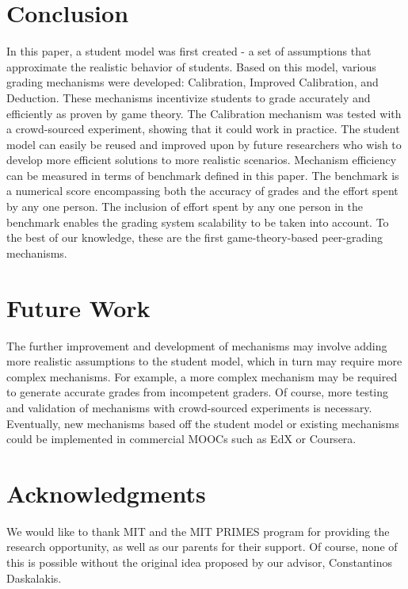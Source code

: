 \documentclass{chi-ext}
\begin{document}


\section{Conclusion}
In this paper, a student model was first created - a set of assumptions that approximate the realistic behavior of students. Based on this model, various grading mechanisms were developed: Calibration, Improved Calibration, and Deduction. These mechanisms incentivize students to grade accurately and efficiently as proven by game theory. The Calibration mechanism was tested with a crowd-sourced experiment, showing that it could work in practice. The student model can easily be reused and improved upon by future researchers who wish to develop more efficient solutions to more realistic scenarios. Mechanism efficiency can be measured in terms of benchmark defined in this paper. The benchmark is a numerical score encompassing both the accuracy of grades and the effort spent by any one person. The inclusion of effort spent by any one person in the benchmark enables the grading system scalability to be taken into account. To the best of our knowledge, these are the first game-theory-based peer-grading mechanisms.

\section{Future Work}
The further improvement and development of mechanisms may involve adding more realistic assumptions to the student model, which in turn may require more complex mechanisms. For example, a more complex mechanism may be required to generate accurate grades from incompetent graders. Of course, more testing and validation of mechanisms with crowd-sourced experiments is necessary. Eventually, new mechanisms based off the student model or existing mechanisms could be implemented in commercial MOOCs such as EdX or Coursera.

\section{Acknowledgments}
We would like to thank MIT and the MIT PRIMES program for providing the research opportunity, as well as our parents for their support. Of course, none of this is possible without the original idea proposed by our advisor, Constantinos Daskalakis.

\balance


\end{document}
